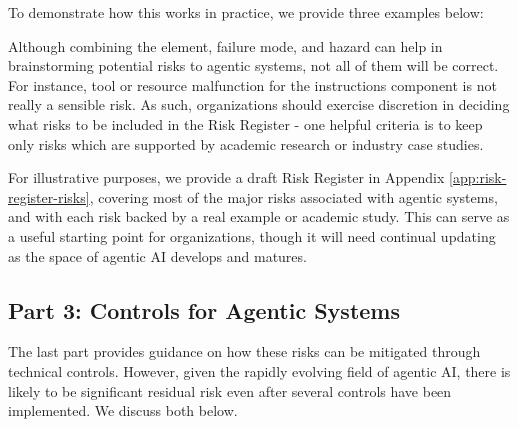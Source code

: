 \documentclass{article}
\begin{document}
To demonstrate how this works in practice, we provide three examples below:


Although combining the element, failure mode, and hazard can help in brainstorming potential risks to agentic systems, not all of them will be correct. For instance, tool or resource malfunction for the instructions component is not really a sensible risk. As such, organizations should exercise discretion in deciding what risks to be included in the Risk Register - one helpful criteria is to keep only risks which are supported by academic research or industry case studies.

For illustrative purposes, we provide a draft Risk Register in Appendix \ref{app:risk-register-risks}, covering most of the major risks associated with agentic systems, and with each risk backed by a real example or academic study. This can serve as a useful starting point for organizations, though it will need continual updating as the space of agentic AI develops and matures. 

\subsection{Part 3: Controls for Agentic Systems}

The last part provides guidance on how these risks can be mitigated through technical controls. However, given the rapidly evolving field of agentic AI, there is likely to be significant residual risk even after several controls have been implemented. We discuss both below.
\end{document}
